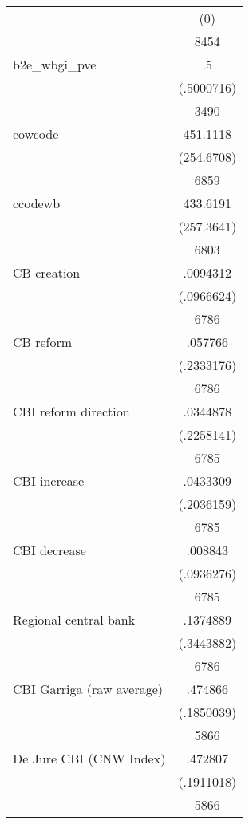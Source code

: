 {\begin{tabular}{l*{1}{c}}
                    &         (0)\\
                    &        8454\\
b2e\_wbgi\_pve        &          .5\\
                    &  (.5000716)\\
                    &        3490\\
cowcode             &    451.1118\\
                    &  (254.6708)\\
                    &        6859\\
ccodewb             &    433.6191\\
                    &  (257.3641)\\
                    &        6803\\
CB creation         &    .0094312\\
                    &  (.0966624)\\
                    &        6786\\
CB reform           &     .057766\\
                    &  (.2333176)\\
                    &        6786\\
CBI  reform direction&    .0344878\\
                    &  (.2258141)\\
                    &        6785\\
CBI increase        &    .0433309\\
                    &  (.2036159)\\
                    &        6785\\
CBI decrease        &     .008843\\
                    &  (.0936276)\\
                    &        6785\\
Regional central bank&    .1374889\\
                    &  (.3443882)\\
                    &        6786\\
CBI Garriga (raw average)&     .474866\\
                    &  (.1850039)\\
                    &        5866\\
De Jure CBI (CNW Index)&     .472807\\
                    &  (.1911018)\\
                    &        5866\\

\end{tabular}}
